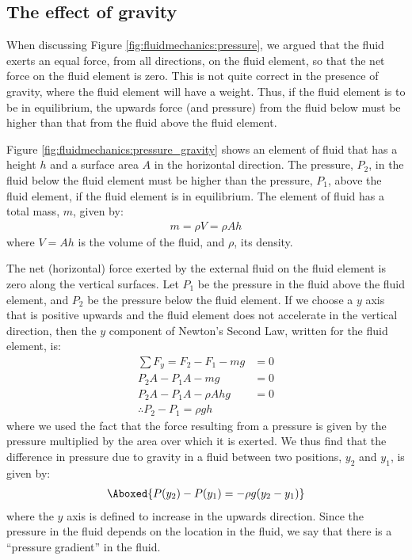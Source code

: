 \subsection{The effect of gravity}
When discussing Figure \ref{fig:fluidmechanics:pressure}, we argued that the fluid exerts an equal force, from all directions, on the fluid element, so that the net force on the fluid element is zero. This is not quite correct in the presence of gravity, where the fluid element will have a weight. Thus, if the fluid element is to be in equilibrium, the upwards force (and pressure) from the fluid below must be higher than that from the fluid above the fluid element. 

Figure \ref{fig:fluidmechanics:pressure_gravity} shows an element of fluid that has a height $h$ and a surface area $A$ in the horizontal direction. The pressure, $P_2$, in the fluid below the fluid element must be higher than the pressure, $P_1$, above the fluid element, if the fluid element is in equilibrium.
The element of fluid has a total mass, $m$, given by:
\begin{align*}
m = \rho V = \rho Ah
\end{align*}
where $V=Ah$ is the volume of the fluid, and $\rho$, its density.

The net (horizontal) force exerted by the external fluid on the fluid element is zero along the vertical surfaces. Let $P_1$ be the pressure in the fluid above the fluid element, and $P_2$ be the pressure below the fluid element. If we choose a $y$ axis that is positive upwards and the fluid element does not accelerate in the vertical direction, then the $y$ component of Newton's Second Law, written for the fluid element, is:
\begin{align*}
\sum F_y = F_2 - F_1 -mg &= 0\\
P_2A - P_1A-mg &=0\\
P_2A - P_1A-\rho Ahg &=0\\
\therefore P_2 - P_1 = \rho gh
\end{align*}
where we used the fact that the force resulting from a pressure is given by the pressure multiplied by the area over which it is exerted. We thus find that the difference in pressure due to gravity in a fluid between two positions, $y_2$ and $y_1$, is given by:
\begin{align}
\label{eq:fluidmechanics:pgrav}
\Aboxed{P(y_2) - P(y_1) = -\rho g (y_2 - y_1)}
\end{align}
where the $y$ axis is defined to increase in the upwards direction. Since the pressure in the fluid depends on the location in the fluid, we say that there is a ``pressure gradient'' in the fluid.

